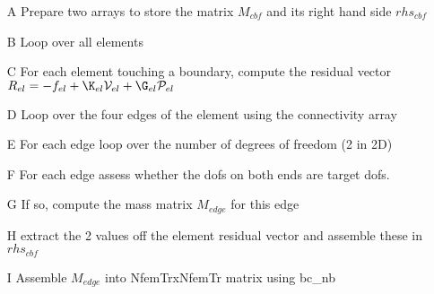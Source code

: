 \begin{itemize}
\item[A] Prepare two arrays to store the matrix $M_{cbf}$ and its right hand side $rhs_{cbf}$  

\item[B] 
Loop over all elements 

\item[C] 
For each element touching a boundary, compute the residual vector 
$R_{el}=-f_{el} + \K_{el}{\cal V}_{el} + \G_{el} {\cal P}_{el}$

\item[D]
Loop over the four edges of the element using the connectivity array

\item[E]
For each edge loop over the number of degrees of freedom (2 in 2D)

\item[F] 
For each edge assess whether the dofs on both ends are target dofs. 

\item[G]
If so, compute the mass matrix $M_{edge}$ for this edge 

\item[H] extract the 2 values off the element residual vector and assemble these
in $rhs_{cbf}$

\item[I] Assemble $M_{edge}$ into NfemTrxNfemTr matrix using bc\_nb
\end{itemize}


